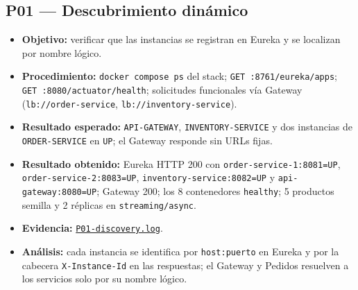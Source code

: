 \documentclass[
  spanish,
  a4paper,
  11pt
]{article}
\providecommand{\tightlist}{\setlength{\itemsep}{0pt}\setlength{\parskip}{0pt}}
\newcommand{\evid}[1]{\href{https://github.com/yan2005dris-afk/SDCC---microservices-with-gateway-and-loadbalancer/blob/develop/docs/evidencias/#1}{{\urlstyle{tt}\nolinkurl{#1}}}}
\begin{document}
\subsection{P01 --- Descubrimiento dinámico}
\begin{itemize}
\tightlist
\item \textbf{Objetivo:} verificar que las instancias se registran en Eureka y se localizan por nombre lógico.
\item \textbf{Procedimiento:} \texttt{docker compose ps} del stack; \texttt{GET :8761/eureka/apps}; \texttt{GET :8080/actuator/health}; solicitudes funcionales vía Gateway (\texttt{lb://order-service}, \texttt{lb://inventory-service}).
\item \textbf{Resultado esperado:} \texttt{API-GATEWAY}, \texttt{INVENTORY-SERVICE} y dos instancias de \texttt{ORDER-SERVICE} en \texttt{UP}; el Gateway responde sin URLs fijas.
\item \textbf{Resultado obtenido:} Eureka HTTP 200 con \texttt{order-service-1:8081=UP}, \texttt{order-service-2:8083=UP}, \texttt{inventory-service:8082=UP} y \texttt{api-gateway:8080=UP}; Gateway 200; los 8 contenedores \texttt{healthy}; 5 productos semilla y 2 réplicas en \texttt{streaming/async}.
\item \textbf{Evidencia:} \evid{P01-discovery.log}.
\item \textbf{Análisis:} cada instancia se identifica por \texttt{host:puerto} en Eureka y por la cabecera \texttt{X-Instance-Id} en las respuestas; el Gateway y Pedidos resuelven a los servicios solo por su nombre lógico.
\end{itemize}
\end{document}

